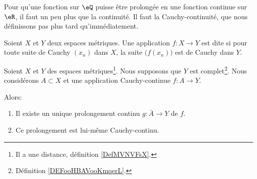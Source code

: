 Pour qu'une fonction sur \( \eQ\) puisse être prolongée en une fonction continue sur \( \eR\), il faut un peu plus que la continuité. Il faut la Cauchy-continuité, que nous définissons pas plus tard qu'immédiatement.

\begin{definition}      \label{DEFooXXOGooXblyKP}
	Soient \( X\) et \( Y\) deux espaces métriques. Une application \( f\colon X\to Y\) est dite  si pour toute suite de Cauchy \( (x_n)\) dans \( X\), la suite \( \big( f(x_n) \big)\) est de Cauchy dans \( Y\).
\end{definition}

\begin{proposition}       \label{PROPooPUNFooFMytOY}
	Soient \( X\) et \( Y\) des espaces métriques\footnote{Il a une distance, définition \ref{DefMVNVFsX}.}. Nous supposons que \( Y\) est complet\footnote{Définition \ref{DEFooHBAVooKmqerL}.}. Nous considérons \( A\subset X\) et une application Cauchy-continue \( f\colon A\to Y\).

	Alors:
	\begin{enumerate}
		\item
		      Il existe un unique prolongement continu \( g\colon \bar A\to Y\) de \( f\).
		\item       \label{ITEMooDEZGooUAvwvF}
		      Ce prolongement est lui-même Cauchy-continu.
	\end{enumerate}
\end{proposition}

